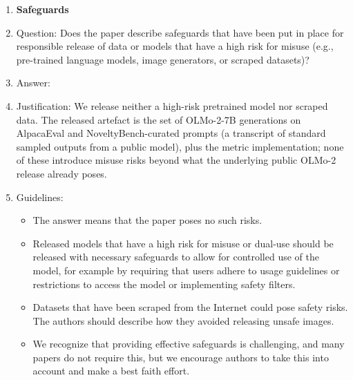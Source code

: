 \begin{enumerate}
\item {\bf Safeguards}
    \item[] Question: Does the paper describe safeguards that have been put in place for responsible release of data or models that have a high risk for misuse (e.g., pre-trained language models, image generators, or scraped datasets)?
    \item[] Answer: \answerNA{}
    \item[] Justification: We release neither a high-risk pretrained model nor scraped data. The released artefact is the set of OLMo-2-7B generations on AlpacaEval and NoveltyBench-curated prompts (a transcript of standard sampled outputs from a public model), plus the metric implementation; none of these introduce misuse risks beyond what the underlying public OLMo-2 release already poses.
    \item[] Guidelines:
    \begin{itemize}
        \item The answer \answerNA{} means that the paper poses no such risks.
        \item Released models that have a high risk for misuse or dual-use should be released with necessary safeguards to allow for controlled use of the model, for example by requiring that users adhere to usage guidelines or restrictions to access the model or implementing safety filters.
        \item Datasets that have been scraped from the Internet could pose safety risks. The authors should describe how they avoided releasing unsafe images.
        \item We recognize that providing effective safeguards is challenging, and many papers do not require this, but we encourage authors to take this into account and make a best faith effort.
    \end{itemize}


\end{enumerate}
